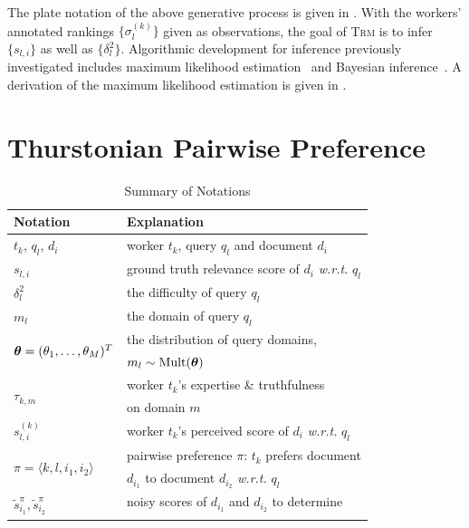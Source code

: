 The plate notation of the above generative process is given in
.  With the workers' annotated rankings
$\{\sigma_l^{(k)}\}$ given as observations, the goal of \textsc{Trm} is to infer
$\{s_{l,i}\}$ as well as $\{\delta_l^2\}$.  Algorithmic development for
inference previously investigated includes maximum likelihood
estimation~\cite{bockenholt1993applications} and Bayesian
inference~\cite{yao1999bayesian}. A derivation of the maximum likelihood
estimation is given in .

\section{Thurstonian Pairwise Preference} \label{sec::tpp_tpp}

\begin{table}[h!]
\caption{Summary of Notations} \label{tab::tpp_notation}
\begin{center}
\begin{tabular}{ll}
\hline
Notation 	& Explanation \\
\hline
\hline
$t_k$, $q_l$, $d_i$					&
      worker $t_k$, query $q_l$ and document $d_i$ \\
$s_{l,i}$  							    &
      ground truth relevance score of $d_i$ \emph{w.r.t.} $q_l$\\
$\delta_l^2$ 						    &
      the difficulty of query $q_l$\\
$m_l$								        &
      the domain of query $q_l$ \\
\multirow{2}{*}{$\boldsymbol{\mathbf{\theta}}=(\theta_1, \dots ,\theta_M)^T$}		&
      the distribution of query domains,      \\                  &
      $m_l \sim \mathrm{Mult}(\boldsymbol{\mathbf{\theta}})$ \\
\multirow{2}{*}{$\tau_{k,m}$}		                                  &
      worker $t_k$'s expertise \& truthfulness \\                 &
      on domain $m$\\
$s_{l,i}^{(k)}$ 						&
      worker $t_k$'s perceived score of $d_i$ \emph{w.r.t.} $q_l$\\
\multirow{2}{*}{$\pi=\langle k,l,i_1,i_2 \rangle$} 	              &
      pairwise preference $\pi$: $t_k$ prefers document \\        &
      $d_{i_1}$ to document $d_{i_2}$ \emph{w.r.t.} $q_l$\\
\multirow{2}{*}{$\tilde{s}_{i_1}^{\pi}, \tilde{s}_{i_2}^{\pi}$}	  &
      noisy scores of $d_{i_1}$ and $d_{i_2}$ to determine \\     &

\end{tabular}
\end{center}
\end{table}
